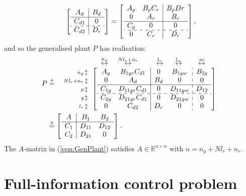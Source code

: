 \documentclass[a4paper,12pt]{article}
\theoremstyle{remark}
\newcommand{\ssmod}[9]{
        \ma{\begin{array}{c|c c}
        #1 & #2 & #3\\ \hline
        #4 & #6 & #7\\
        #5 & #8 & #9
        \end{array}}}
\newcommand{\arr}[2]{
        \begin{array}{#1}
        #2
        \end{array}}
\newcommand{\shorteq}{\stackrel{s}{=}}
\newcommand{\ma}[1]{\begin{bmatrix} #1 \end{bmatrix}}
\newcommand{\als}[1]{\begin{align*} #1 \end{align*}}
\newcommand{\aln}[1]{\begin{align} #1 \end{align}}
\newcommand{\szo}[2]{#1\in \mathbb{R}^{#2}}
\begin{document}
\als{
\ma{\arr{c|c}{
A_d&B_d\\\hline
C_{d1}&0\\\hdashline
C_{d2}&D_r
}}
=\ma{\arr{cc|c}{
A_p &B_pC_r&B_pDr\\
0&A_r&B_r\\\hline
C_p&0&0\\\hdashline
0&C_r&D_r
}},
}
and so the generalised plant $P$ has realisation:
\aln{
P&\shorteq
\arr{c}{
\hspace{1.5cm}\stackrel{n_g}{\leftrightarrow}\hspace{0.5cm}
\stackrel{Nl_r+n_r}{\leftrightarrow}\hspace{0.9cm}
\stackrel{l_r}{\leftrightarrow}\hspace{0.6cm}
\stackrel{l_w}{\leftrightarrow}\hspace{0.8cm}
\stackrel{m}{\leftrightarrow} \\
\arr{r}{
\scriptstyle{n_g} \,\updownarrow\\
\scriptstyle{Nl_r+n_r} \,\updownarrow\\
\scriptstyle{p} \,\updownarrow\\
\scriptstyle{q} \,\updownarrow\\
\scriptstyle{l_r} \,\updownarrow} 
\ma{\arr{cc|cc:c}{
A_g&B_{1gr}C_{d1}&0&B_{1gw}&B_{2g}\\
0&A_d&B_{d}&0&0\\\hline
C_{1g} &D_{11gr}C_{d1} &0&D_{11gw}&D_{12}\\ \hdashline
C_{2g}&D_{21gr}C_{d1}&0&D_{21gw}&0\\
0&C_{d2}&D_r&0&0
}}}\label{eqn:P}\\
&\shorteq\ssmod{A}{B_1}{B_2}{C_1}{C_2}{D_{11}}{D_{12}}{D_{21}}{0}. \label{eqn:GenPlant}
}
The $A$-matrix in (\ref{eqn:GenPlant}) satisfies $\szo{A}{n\times n}$ with $n=n_g+Nl_r+n_r$.





 
\section{Full-information control problem}
\label{sec:H2FI}
\end{document}
